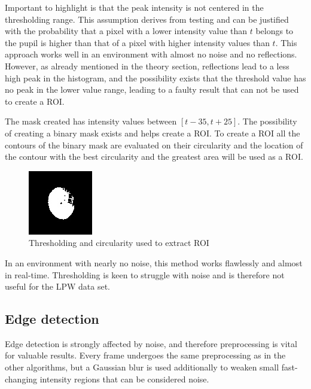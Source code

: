 Important to highlight is that the peak intensity is not centered in the thresholding range. This assumption derives from testing and can be justified with the probability that a pixel with a lower intensity value than $t$ belongs to the pupil is higher than that of a pixel with higher intensity values than $t$. This approach works well in an environment with almost no noise and no reflections. However, as already mentioned in the theory section, reflections lead to a less high peak in the histogram, and the possibility exists that the threshold value has no peak in the lower value range, leading to a faulty result that can not be used to create a ROI.

The mask created has intensity values between $[t-35, t+25]$. The possibility of creating a binary mask exists and helps create a ROI. To create a ROI all the contours of the binary mask are evaluated on their circularity and the location of the contour with the best circularity and the greatest area will be used as a ROI.
\begin{figure}[h]
    \centering
        \includegraphics[width=0.3\linewidth]{plots/thresh.png}
    \caption{Thresholding and circularity used to extract ROI}
    \label{fig:threshold_roi}
\end{figure}
In an environment with nearly no noise, this method works flawlessly and almost in real-time. Thresholding is keen to struggle with noise and is therefore not useful for the LPW data set.
\subsection{Edge detection}
Edge detection is strongly affected by noise, and therefore preprocessing is vital for valuable results. Every frame undergoes the same preprocessing as in the other algorithms, but a Gaussian blur is used additionally to weaken small fast-changing intensity regions that can be considered noise.

